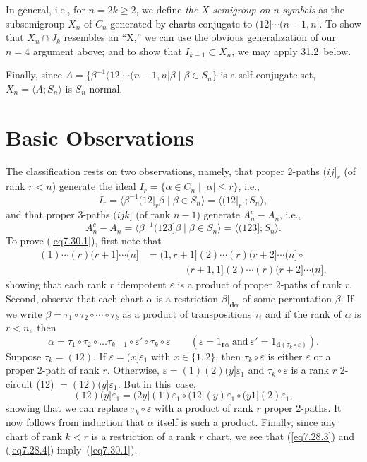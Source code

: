 \documentclass{surv-l}
\numberwithin{equation}{section}
\numberwithin{table}{section}
\numberwithin{figure}{section}
\theoremstyle{plain}
\theoremstyle{definition}
\begin{document}
In general, i.e., for $n =2k\geq 2$, we define \emph{the} $X$
\emph{semigroup on} $n$ \emph{symbols} as the
subsemigroup $X_{n}$ of $C_{n}$ generated by charts conjugate to
$(12]\cdots(n - 1, n]$. To show that $X_{n}\cap J_{k}$ resembles
an ``X,'' we can use the obvious generalization of our $n =4$
argument above; and to show that $I_{k-1}\subset X_{n}$, we may
apply 31.2~below.

Finally, since $A=\{\beta^{-1}(12]\cdots(n-1, n]\beta\mid
\beta\in S_{n}\}$ is a self-conjugate set, $X_{n}=\langle
A;S_{n}\rangle$ is $S_{n}$-normal.

\section{Basic Observations}\label{sec7.30}

The classification rests on two observations, namely, that proper
2-paths $(ij]_{r}$ (of rank $r<n$) generate the ideal
$I_{r}=\{\alpha\in C_{n}\mid |\alpha|\leq r\}$, i.e.,
\begin{equation}\label{eq7.30.1}
 I_{r}=\langle \beta^{-1}(12]_{r}\beta\mid \beta\in S_{n}\rangle=\langle(12]_{r}.;S_{n}\rangle,
\end{equation}
and that proper 3-paths $(ijk]$ (of rank $n -1$) generate
$A_{n}^{c}-A_{n}$, i.e.,
\begin{equation}\label{eq7.30.2}
  A_{n}^{c}-A_{n}=\langle\beta^{-1}(123]\beta\mid \beta\in S_{n}\rangle=\langle (123];S_{n}\rangle.
\end{equation}
To prove (\ref{eq7.30.1}), first note that
\begin{align*}
(1)\cdots (r)(r+1]\cdots(n]&=(1, r+1](2)\cdots(r)(r+2]\cdots(n]\circ \\
&\qquad\qquad (r+1,1](2)\cdots(r)(r+2]\cdots(n],
\end{align*}
showing that each rank $r$ idempotent $\varepsilon$ is a product
of proper 2-paths of rank $r$. Second, observe that each chart
$\alpha$ is a restriction $\beta|_{\mathbf{d}\alpha}$ of some
permutation $\beta$: If we write $\beta=\tau_{1}\circ
\tau_{2}\circ\cdots \circ \tau_{k}$ as a product of transpositions
$\tau_{i}$ and if the rank of $\alpha$ is $r<n$,~then
\[
\alpha=\tau_{1}\circ\tau_{2}\circ\ldots
\tau_{k-1}\circ\varepsilon'\circ\tau_{k}\circ\varepsilon\qquad
(\varepsilon=1_{\mathbf{r}\alpha}\ \mathrm{and}\
\varepsilon'=1_{\mathbf{d}(\tau_{k}\circ\varepsilon)}).
\]
Suppose $\tau_{k}=(12)$. If $\varepsilon=(x]\varepsilon_{1}$ with
$x\in\{1,2\}$, then $\tau_{k}\circ\varepsilon$ is either
$\varepsilon$ or a proper 2-path of rank $r$. Otherwise,
$\varepsilon =(1)(2)(y]\varepsilon_{1}$ and
$\tau_{k}\circ\varepsilon$ is a rank $r$ 2-circuit (12)
$=(12)(y]\varepsilon_{1}$. But in this~case,
\[
(12)(y]\varepsilon_{1}=(2y](1)\varepsilon_{1}\circ (12](y)\varepsilon_{1}\circ (y1](2)\varepsilon_{1},
\]
showing that we can replace $\tau_{k}\circ\varepsilon$ with a
product of rank $r$ proper 2-paths. It now follows from induction
that $\alpha$ itself is such a product. Finally, since any chart
of rank $k<r$ is a restriction of a rank $r$ chart, we see that
(\ref{eq7.28.3}) and (\ref{eq7.28.4}) imply~(\ref{eq7.30.1}).
\end{document}
